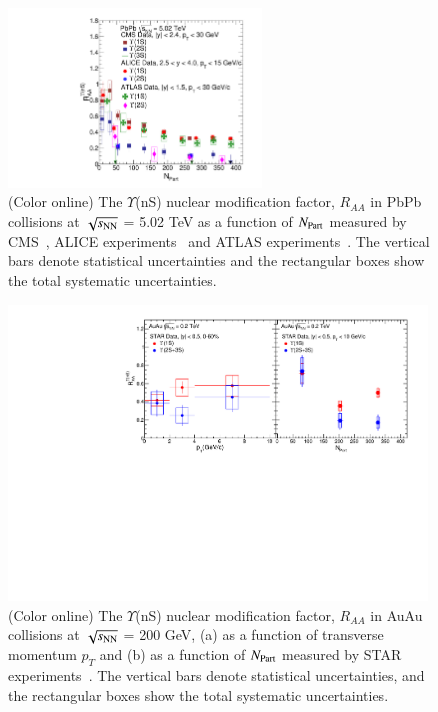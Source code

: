 \begin{figure}
  \begin{center}
  \includegraphics[width=0.6\textwidth]{Figures/ExpOverview/Fig_LHC_YnSRAANPart.pdf}
  \caption{(Color online) The $\Upsilon$(nS) nuclear modification factor, $R_{AA}$
   in PbPb collisions at $\sqrt{s_{\rm NN}}$ = 5.02 TeV as a function of $N_{\rm Part}$
   measured by CMS~\cite{CMS:2018zza}, ALICE experiments~\cite{ALICE:2020wwx} and
   ATLAS experiments~\cite{ALICE:2020wwx}.
   The vertical bars denote statistical uncertainties and the rectangular boxes show
   the total systematic uncertainties.
  }
  \label{fig:LHCYnSRAANPart}
  \end{center}
\end{figure}



\begin{figure}
  \includegraphics[width=0.99\textwidth]{Figures/ExpOverview/Fig_RHIC_YnSRAAPt.pdf}
  \caption{(Color online) The $\Upsilon$(nS) nuclear modification factor, $R_{AA}$
in AuAu collisions at $\sqrt{s_{\rm NN}}$ = 200 GeV,
     (a) as a function of transverse momentum $p_{T}$
    and (b) as a function of $N_{\rm Part}$ measured by STAR experiments~\cite{Wang:2019vau}. The vertical bars denote
    statistical uncertainties, and the rectangular boxes show the total systematic uncertainties.
  }
  \label{fig:RHICYnSRAAPt}
\end{figure}



